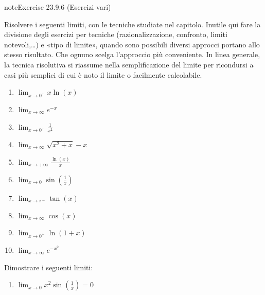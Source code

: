 \documentclass[letterpaper,10pt,italian]{jupyterBook}
\begin{document}
\begin{sphinxadmonition}{note}{Exercise 23.9.6 (Esercizi vari)}



\sphinxAtStartPar
Risolvere i seguenti limiti, con le tecniche studiate nel capitolo. Inutile qui fare la divisione degli esercizi per tecniche (razionalizzazione, confronto, limiti notevoli,…) e «tipo di limite», quando sono possibili diversi approcci portano allo stesso risultato. Che ognuno scelga l’approccio più conveniente. In linea generale, la tecnica risolutiva si riassume nella semplificazione del limite per ricondursi a casi più semplici di cui è noto il limite o facilmente calcolabile.
\begin{enumerate}
%
\item {} 
\sphinxAtStartPar
\(\lim_{x \to 0^+} x \ln(x)\)

\item {} 
\sphinxAtStartPar
\(\lim_{x \to \infty} e^{-x}\)

\item {} 
\sphinxAtStartPar
\(\lim_{x \to 0^+} \frac{1}{x^2}\)

\item {} 
\sphinxAtStartPar
\(\lim_{x \to \infty} \sqrt{x^2 + x} - x\)

\item {} 
\sphinxAtStartPar
\(\lim_{x \to +\infty} \frac{\ln(x)}{x}\)

\item {} 
\sphinxAtStartPar
\(\lim_{x \to 0} \sin\left(\frac{1}{x}\right)\)

\item {} 
\sphinxAtStartPar
\(\lim_{x \to \pi^-} \tan(x)\)

\item {} 
\sphinxAtStartPar
\(\lim_{x \to \infty} \cos(x)\)

\item {} 
\sphinxAtStartPar
\(\lim_{x \to 0^+} \ln(1 + x)\)

\item {} 
\sphinxAtStartPar
\(\lim_{x \to \infty} e^{-x^2}\)

\end{enumerate}

\sphinxAtStartPar
Dimostrare i seguenti limiti:
\begin{enumerate}
%
\item {} 
\sphinxAtStartPar
\(\lim_{x \to 0} x^2 \sin\left(\frac{1}{x}\right) = 0\)


\end{enumerate}
\end{sphinxadmonition}
\end{document}
